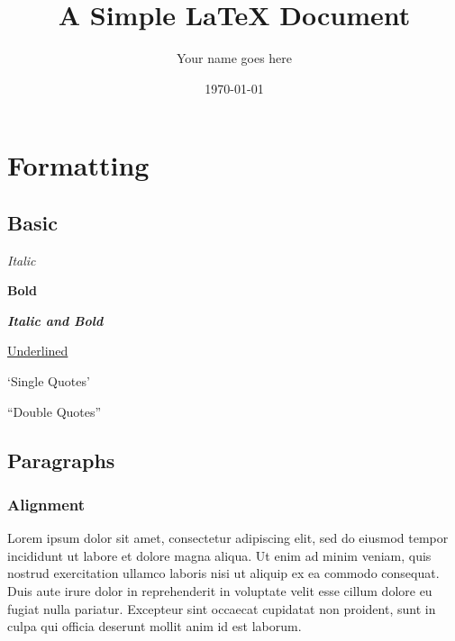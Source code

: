 \documentclass[11pt]{article} %
\title{\textbf{A Simple \LaTeX{} Document}}
\author{Your name goes here\\}
\date{\today}
\begin{document}
\maketitle %

\section{Formatting} %

\subsection{Basic} %
\begin{itemize} %
\begin{multicols}{2} %
	\item \textit{Italic}
	\item \textbf{Bold}
	\item \textbf{\textit{Italic and Bold}}
	\item \underline{Underlined}
	\item `Single Quotes'
	\item``Double Quotes''
\end{multicols}
\end{itemize}

\subsection{Paragraphs}
\subsubsection{Alignment}
\begin{flushleft} %
Lorem ipsum dolor sit amet, consectetur adipiscing elit, sed do eiusmod tempor incididunt ut labore et dolore magna aliqua. Ut enim ad minim veniam, quis nostrud exercitation ullamco laboris nisi ut aliquip ex ea commodo consequat. Duis aute irure dolor in reprehenderit in voluptate velit esse cillum dolore eu fugiat nulla pariatur. Excepteur sint occaecat cupidatat non proident, sunt in culpa qui officia deserunt mollit anim id est laborum.
\end{flushleft}
\end{document}
